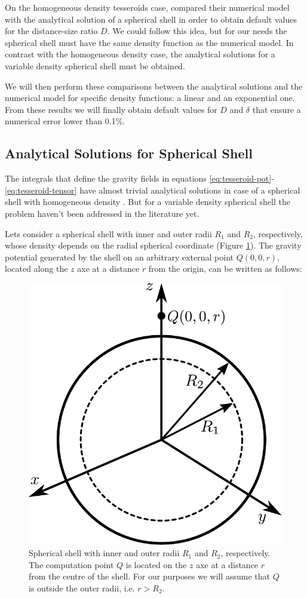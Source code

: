 \documentclass[extra]{gji}
\begin{document}
On the homogeneous density tesseroids case, \citet{Uieda2016} compared 
their numerical model with the analytical solution of a spherical 
shell in order to obtain default values for the distance-size ratio 
$D$.
We could follow this idea, but for our needs the spherical shell must 
have the same density function as the numerical model.
In contrast with the homogeneous density case, the analytical solutions 
for a variable density spherical shell must be obtained.

We will then perform these comparisons between the analytical solutions 
and the numerical model for specific density functions: a linear and an 
exponential one.
From these results we will finally obtain default values for $D$ 
and $\delta$ that ensure a numerical error lower than 0.1\%.


\subsection{Analytical Solutions for Spherical Shell}

The integrals that define the gravity fields in equations 
\ref{eq:tesseroid-pot}-\ref{eq:tesseroid-tensor} have almost trivial 
analytical solutions in case of a spherical shell with homogeneous 
density \citep{Mikuska2006,Grombein2013}.
But for a variable density spherical shell the problem haven't been 
addressed in the literature yet.

Lets consider a spherical shell with inner and outer radii $R_1$ and 
$R_2$, respectively, whose density depends on the radial spherical 
coordinate (Figure \ref{fig:spherical-shell}).
The gravity potential generated by the shell on an arbitrary external 
point $Q(0,0,r)$, located along the $z$ axe at a distance $r$ from the 
origin, can be written as follows:

\begin{figure}
\centering
\includegraphics[width=0.7\linewidth]{figures/spherical-shell.pdf}
\caption{
    Spherical shell with inner and outer radii $R_1$ and $R_2$, respectively.
    The computation point $Q$ is located on the $z$ axe at a distance $r$ from
    the centre of the shell.
    For our purposes we will assume that $Q$ is outside the outer radii,
    i.e. $r > R_2$.
    }
\label{fig:spherical-shell}
\end{figure}
\end{document}
